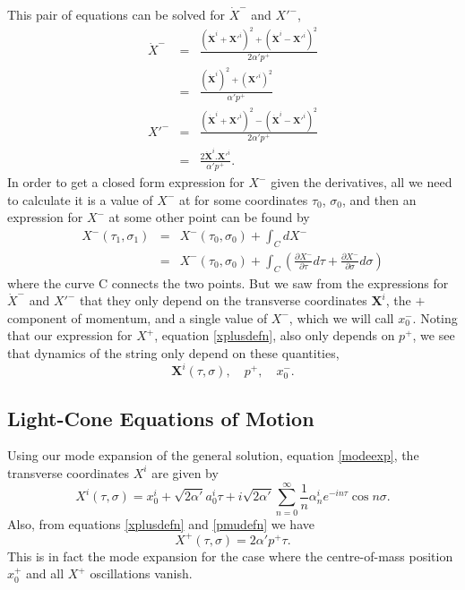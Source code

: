\documentclass[a4paper,12pt]{article}
\numberwithin{equation}{section}
\begin{document}
This pair of equations can be solved for $\dot{X}^-$ and $X'^-$,
\begin{eqnarray}
\dot{X}^- &=& \frac{(\dot{\mathbf{X}}^i + \mathbf{X}'^i)^2 + (\dot{\mathbf{X}}^i - \mathbf{X}'^i)^2}{2\alpha'p^+}\\
&=& \frac{(\dot{\mathbf{X}}^i)^2 + (\mathbf{X}'^i)^2}{\alpha'p^+}\label{xdotminus}\\
X'^- &=& \frac{(\dot{\mathbf{X}}^i + \mathbf{X}'^i)^2 - (\dot{\mathbf{X}}^i - \mathbf{X}'^i)^2}{2\alpha'p^+}\\
&=& \frac{2\dot{\mathbf{X}}^i.\mathbf{X}'^i}{\alpha'p^+}.
\end{eqnarray}
In order to get a closed form expression for $X^-$ given the derivatives, all we need to calculate it is a value of $X^-$ at for some coordinates $\tau_0$, $\sigma_0$, and then an expression for $X^-$ at some other point can be found by
\begin{eqnarray*}
X^-(\tau_1, \sigma_1) &=& X^-(\tau_0, \sigma_0) + \int_C dX^-\\
&=& X^-(\tau_0, \sigma_0) + \int_C \left(\frac{\partial X^-}{\partial \tau} d\tau +  \frac{\partial X^-}{\partial \sigma}d\sigma \right)
\end{eqnarray*}
where the curve C connects the two points. But we saw from the expressions for $\dot{X}^-$ and $X'^-$ that they only depend on the transverse coordinates $\mathbf{X}^i$, the $+$ component of momentum, and a single value of $X^-$, which we will call $x^-_0$. Noting that our expression for $X^+$, equation \ref{xplusdefn}, also only depends on $p^+$, we see that dynamics of the string only depend on these quantities, 
\begin{equation}
\mathbf{X}^i(\tau, \sigma), \quad p^+, \quad x^-_0.
\end{equation}
\subsection{Light-Cone Equations of Motion}\label{lceom}
Using our mode expansion of the general solution, equation \ref{modeexp}, the transverse coordinates $X^i$ are given by
\begin{equation}\label{imodeexp}
X^i (\tau, \sigma) = x_0^i + \sqrt{2\alpha'} a_0^i \tau + i\sqrt{2\alpha'}\sum_{n=0}^\infty \frac{1}{n} \alpha_n^i e^{-in\tau} \cos n\sigma.
\end{equation}
Also, from equations \ref{xplusdefn} and \ref{pmudefn} we have
\begin{equation}
X^+(\tau, \sigma) = 2\alpha'p^+\tau. \label{xplusfoo}
\end{equation}
This is in fact the mode expansion for the case where the centre-of-mass position $x^+_0$ and all $X^+$ oscillations vanish.
\end{document}
